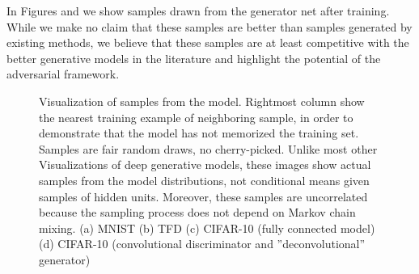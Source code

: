 In Figures %
and %
we show samples drawn from the generator net after training. While we make no claim that these samples are better than samples generated by existing methods, we believe that these samples are at least competitive with the better generative models in the literature and highlight the potential of the adversarial framework.

\begin{figure}[htb]
	\centering
	\caption{Visualization of samples from the model. Rightmost column show the nearest training example of neighboring sample, in order to demonstrate that the model has not memorized the training set. Samples are fair random draws, no cherry-picked. Unlike most other Visualizations of deep generative models, these images show actual samples from the model distributions, not conditional means given samples of hidden units. Moreover, these samples are uncorrelated because the sampling process does not depend on Markov chain mixing. (a) MNIST (b) TFD (c) CIFAR-10 (fully connected model) (d) CIFAR-10 (convolutional discriminator and ''deconvolutional'' generator)}
\end{figure}

